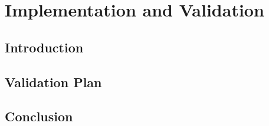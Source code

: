 \chapter{Implementation and Validation}
\section{Introduction}
\section{Validation Plan}
\section{Conclusion}